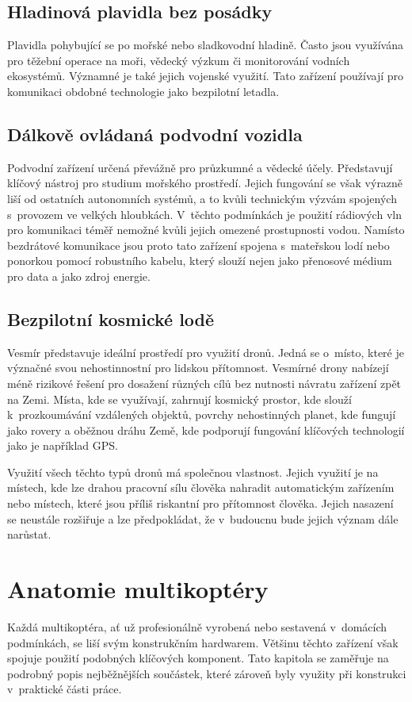 \documentclass[12pt]{report}
\begin{document}
\section[Hladinová plavidla bez posádky]{Hladinová plavidla bez posádky}
Plavidla pohybující se po mořské nebo sladkovodní hladině. Často jsou využívána pro těžební operace na moři, vědecký výzkum či monitorování vodních ekosystémů. Významné je také jejich vojenské využití. Tato zařízení používají pro komunikaci obdobné technologie jako bezpilotní letadla. \cite{mainbook}

\section[Dálkově ovládaná podvodní vozidla]{Dálkově ovládaná podvodní vozidla}
Podvodní zařízení určená převážně pro průzkumné a vědecké účely. Představují klíčový nástroj pro studium mořského prostředí. Jejich fungování se však výrazně liší od ostatních autonomních systémů, a to kvůli technickým výzvám spojených s~provozem ve velkých hloubkách. V~těchto podmínkách je použití rádiových vln pro komunikaci téměř nemožné kvůli jejich omezené prostupnosti vodou. Namísto bezdrátové komunikace jsou proto tato zařízení spojena s~mateřskou lodí nebo ponorkou pomocí robustního kabelu, který slouží nejen jako přenosové médium pro data a jako zdroj energie. \cite{mainbook}

\section[Bezpilotní kosmické lodě]{Bezpilotní kosmické lodě}
Vesmír představuje ideální prostředí pro využití dronů. Jedná se o~místo, které je význačné svou nehostinnostní pro lidskou přítomnost. Vesmírné drony nabízejí méně rizikové řešení pro dosažení různých cílů bez nutnosti návratu zařízení zpět na Zemi. Místa, kde se využívají, zahrnují kosmický prostor, kde slouží k~prozkoumávání vzdálených objektů, povrchy nehostinných planet, kde fungují jako rovery a oběžnou dráhu Země, kde podporují fungování klíčových technologií jako je například GPS. \cite{mainbook}

Využití všech těchto typů dronů má společnou vlastnost. Jejich využití je na místech, kde lze drahou pracovní sílu člověka nahradit automatickým zařízením nebo místech, které jsou příliš riskantní pro přítomnost člověka. Jejich nasazení se neustále rozšiřuje a lze předpokládat, že v~budoucnu bude jejich význam dále narůstat.

\chapter[Anatomie multikoptéry]{Anatomie multikoptéry}
Každá multikoptéra, ať už profesionálně vyrobená nebo sestavená v~domácích podmínkách, se liší svým konstrukčním hardwarem. Většinu těchto zařízení však spojuje použití podobných klíčových komponent. Tato kapitola se zaměřuje na podrobný popis nejběžnějších součástek, které zároveň byly využity při konstrukci v~praktické části práce.
\end{document}
